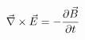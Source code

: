 \documentclass[preview]{standalone}
\begin{document}
\begin{align*}
\special{dvisvgm:raw <g id='unique000'>}\vec{\nabla} \times \vec{E} = - \frac{\partial \vec{B}}{\partial t}\special{dvisvgm:raw </g>}
\end{align*}
\end{document}
